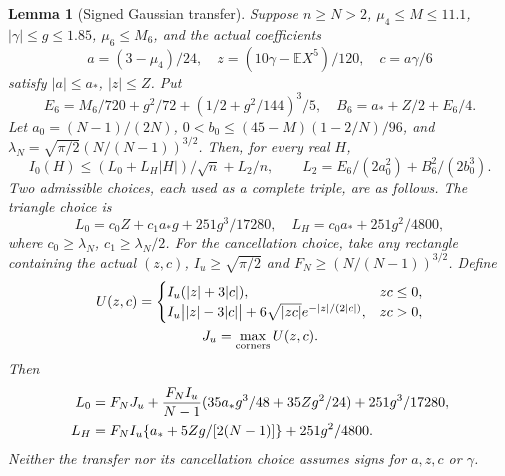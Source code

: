 \documentclass[11pt,a4paper]{article}
\numberwithin{equation}{section}
\newtheorem{lemma}[theorem]{Lemma}
\theoremstyle{definition}
\theoremstyle{remark}
\newcommand{\E}{\mathbb E}
\begin{document}
\begin{lemma}[Signed Gaussian transfer]\label{cut49:fourier:early-low}
\label{cut49:fourier:paired-low}\label{cut49:entryleap:fourier-transfer}
Suppose $n\ge N>2$, $\mu_4\le M\le11.1$, $|\gamma|\le g\le1.85$,
$\mu_6\le M_6$, and the actual coefficients
\[
 a=(3-\mu_4)/24,\quad z=(10\gamma-\E X^5)/120,\quad c=a\gamma/6
\]
satisfy $|a|\le a_*$, $|z|\le Z$. Put
\begin{equation}\label{cut49:fourier:taylor}
 E_6=M_6/720+g^2/72+(1/2+g^2/144)^3/5,\quad
 B_6=a_*+Z/2+E_6/4.
\end{equation}
Let $a_0=(N-1)/(2N)$,
$0<b_0\le(45-M)(1-2/N)/96$, and
$\lambda_N=\sqrt{\pi/2}(N/(N-1))^{3/2}$.
Then, for every real $H$,
\begin{equation}\label{cut49:fourier:low-form}
 I_0(H)\le(L_0+L_H|H|)/\sqrt n+L_2/n,
 \qquad L_2=E_6/(2a_0^2)+B_6^2/(2b_0^3).
\end{equation}
Two admissible choices, each used as a complete triple, are as follows.
The triangle choice is
\begin{equation}\label{cut49:fourier:early}
 L_0=c_0Z+c_1a_*g+251g^3/17280,\quad
 L_H=c_0a_*+251g^2/4800,
\end{equation}
where $c_0\ge\lambda_N$, $c_1\ge\lambda_N/2$.
For the cancellation choice, take any rectangle containing the actual
$(z,c)$, $I_u\ge\sqrt{\pi/2}$ and $F_N\ge(N/(N-1))^{3/2}$. Define
\begin{gather*}
 U(z,c)=\begin{cases}
 I_u(|z|+3|c|),&zc\le0,\\
 I_u\bigl||z|-3|c|\bigr|+6\sqrt{|zc|}e^{-|z|/(2|c|)},&zc>0,
 \end{cases}\\
 J_u=\max_{\rm corners}U(z,c).
\end{gather*}
Then
\begin{align}\label{cut49:fourier:paired}
 L_0&=F_NJ_u+\frac{F_NI_u}{N-1}
 (35a_*g^3/48+35Zg^2/24)+251g^3/17280,\notag\\
 L_H&=F_NI_u\{a_*+5Zg/[2(N-1)]\}+251g^2/4800.
\end{align}
Neither the transfer nor its cancellation choice assumes signs for
$a,z,c$ or $\gamma$.
\end{lemma}
\end{document}
